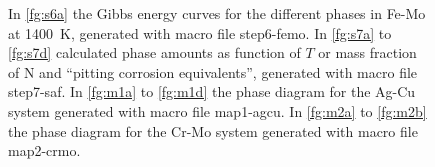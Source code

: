 \documentclass[12pt]{article}
\begin{document}
\begin{figure}
\begin{center}
%
%
%
\end{center}
%
\caption{In \ref{fg:s6a} the Gibbs energy curves for the different
  phases in Fe-Mo at 1400~K, generated with macro file step6-femo.  In
  \ref{fg:s7a} to \ref{fg:s7d} calculated phase amounts as function of
  $T$ or mass fraction of N and ``pitting corrosion equivalents'',
  generated with macro file step7-saf.  In \ref{fg:m1a} to
  \ref{fg:m1d} the phase diagram for the Ag-Cu system generated with
  macro file map1-agcu.  In \ref{fg:m2a} to \ref{fg:m2b} the phase
  diagram for the Cr-Mo system generated with macro file map2-crmo.}
\end{figure}
\end{document}
